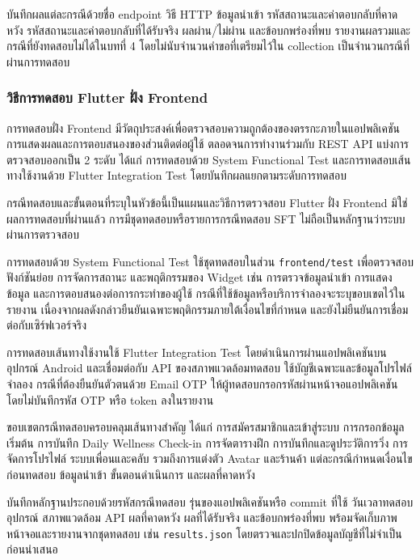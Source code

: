 บันทึกผลแต่ละกรณีด้วยชื่อ endpoint วิธี HTTP ข้อมูลนำเข้า รหัสสถานะและค่าตอบกลับที่คาดหวัง รหัสสถานะและค่าตอบกลับที่ได้รับจริง ผลผ่าน/ไม่ผ่าน และข้อบกพร่องที่พบ รายงานผลรวมและกรณีที่ยังทดสอบไม่ได้ในบทที่ 4 โดยไม่นับจำนวนคำขอที่เตรียมไว้ใน collection เป็นจำนวนกรณีที่ผ่านการทดสอบ

\subsubsection{วิธีการทดสอบ Flutter ฝั่ง Frontend}
\label{sec:frontend-test-method}

การทดสอบฝั่ง Frontend มีวัตถุประสงค์เพื่อตรวจสอบความถูกต้องของตรรกะภายในแอปพลิเคชัน การแสดงผลและการตอบสนองของส่วนติดต่อผู้ใช้ ตลอดจนการทำงานร่วมกับ REST API แบ่งการตรวจสอบออกเป็น 2 ระดับ ได้แก่ การทดสอบด้วย System Functional Test และการทดสอบเส้นทางใช้งานด้วย Flutter Integration Test โดยบันทึกผลแยกตามระดับการทดสอบ

กรณีทดสอบและขั้นตอนที่ระบุในหัวข้อนี้เป็นแผนและวิธีการตรวจสอบ Flutter ฝั่ง Frontend มิใช่ผลการทดสอบที่ผ่านแล้ว การมีชุดทดสอบหรือรายการกรณีทดสอบ SFT ไม่ถือเป็นหลักฐานว่าระบบผ่านการตรวจสอบ

การทดสอบด้วย System Functional Test ใช้ชุดทดสอบในส่วน \texttt{frontend/test} เพื่อตรวจสอบฟังก์ชันย่อย การจัดการสถานะ และพฤติกรรมของ Widget เช่น การตรวจข้อมูลนำเข้า การแสดงข้อมูล และการตอบสนองต่อการกระทำของผู้ใช้ กรณีที่ใช้ข้อมูลหรือบริการจำลองจะระบุขอบเขตไว้ในรายงาน เนื่องจากผลดังกล่าวยืนยันเฉพาะพฤติกรรมภายใต้เงื่อนไขที่กำหนด และยังไม่ยืนยันการเชื่อมต่อกับเซิร์ฟเวอร์จริง

การทดสอบเส้นทางใช้งานใช้ Flutter Integration Test โดยดำเนินการผ่านแอปพลิเคชันบนอุปกรณ์ Android และเชื่อมต่อกับ API ของสภาพแวดล้อมทดสอบ ใช้บัญชีเฉพาะและข้อมูลโปรไฟล์จำลอง กรณีที่ต้องยืนยันตัวตนด้วย Email OTP ให้ผู้ทดสอบกรอกรหัสผ่านหน้าจอแอปพลิเคชัน โดยไม่บันทึกรหัส OTP หรือ token ลงในรายงาน

ขอบเขตกรณีทดสอบครอบคลุมเส้นทางสำคัญ ได้แก่ การสมัครสมาชิกและเข้าสู่ระบบ การกรอกข้อมูลเริ่มต้น การบันทึก Daily Wellness Check-in การจัดตารางฝึก การบันทึกและดูประวัติการวิ่ง การจัดการโปรไฟล์ ระบบเพื่อนและคลับ รวมถึงการแต่งตัว Avatar และร้านค้า แต่ละกรณีกำหนดเงื่อนไขก่อนทดสอบ ข้อมูลนำเข้า ขั้นตอนดำเนินการ และผลที่คาดหวัง

บันทึกหลักฐานประกอบด้วยรหัสกรณีทดสอบ รุ่นของแอปพลิเคชันหรือ commit ที่ใช้ วันเวลาทดสอบ อุปกรณ์ สภาพแวดล้อม API ผลที่คาดหวัง ผลที่ได้รับจริง และข้อบกพร่องที่พบ พร้อมจัดเก็บภาพหน้าจอและรายงานจากชุดทดสอบ เช่น \texttt{results.json} โดยตรวจและปกปิดข้อมูลบัญชีที่ไม่จำเป็นก่อนนำเสนอ

